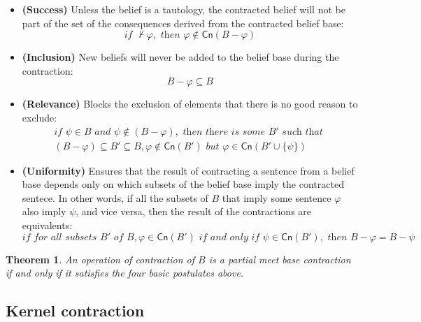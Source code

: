 \begin{itemize}
    \item[] \textbf{(Success)} Unless the belief is a tautology, the contracted belief will not be part of the set of the consequences derived from the contracted belief base:
    $$\textit{if } \nvdash \varphi, \textit{ then } \varphi \notin \textsf{Cn}(B - \varphi)$$

    \item[] \textbf{(Inclusion)} New beliefs will never be added to the belief base during the contraction:
    $$B - \varphi \subseteq B$$

    \item[] \textbf{(Relevance)} Blocks the exclusion of elements that there is no good reason to exclude:
    \begin{equation*}
        \begin{split}
            \textit{if } \psi \in B \textit{ and } \psi \notin  (B - \varphi), \textit{ then there is some } B' \textit{ such that }  \\
                (B - \varphi) \subseteq B' \subseteq B, \varphi \notin \textsf{Cn}(B') \textit{ but } \varphi \in \textsf{Cn}(B' \cup \{ \psi \})
        \end{split}
    \end{equation*}

    \item[] \textbf{(Uniformity)} Ensures that the result of contracting a sentence from a belief base depends only on which subsets of the belief base imply the contracted sentece. In other words, if all the subsets of $B$ that imply some sentence $\varphi$ also imply $\psi$, and vice versa, then the result of the contractions are equivalents:
    $$\textit{if for all subsets } B' \textit{ of } B, \varphi \in \textsf{Cn}(B') \textit{ if and only if } \psi \in \textsf{Cn}(B'), \textit{ then } B - \varphi = B - \psi$$
\end{itemize}

\newtheorem{theorem}{Theorem}[chapter]

\begin{theorem}
    An operation of contraction of $B$ is a \textit{partial meet base contraction} if and only if it satisfies the four basic postulates above.    
\end{theorem}

\subsection{Kernel contraction}


